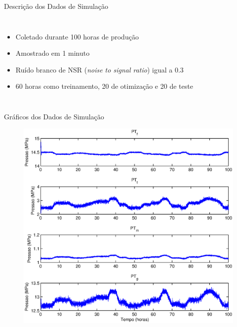 \documentclass{beamer}
\begin{document}
\begin{frame}{Descrição dos Dados de Simulação}
\begin{columns}[T]
\begin{itemize}
                \begin{itemize}
                    \item fundo do poço (PT$_f$)
                    \item topo do tubo de produção (PT$_t$)
                    \item topo do anular (PT$_g$)
                    \item a montante do \textit{choke} de injeção (PT$_m$)
                \end{itemize}
            \item Coletado durante 100 horas de produção
            \item Amostrado em 1 minuto
            \item Ruído branco de NSR (\textit{noise to signal ratio}) igual a 0.3
            \item 60 horas como treinamento, 20 de otimização e 20 de teste
        \end{itemize}
    \end{columns}

\end{frame}

\begin{frame}{Gráficos dos Dados de Simulação}

    \begin{figure}[!htb]
        \centering
        \includegraphics[height=\textheight]{figuras/sim_dataset.eps}
    \end{figure}

    
\end{frame}
\end{document}
